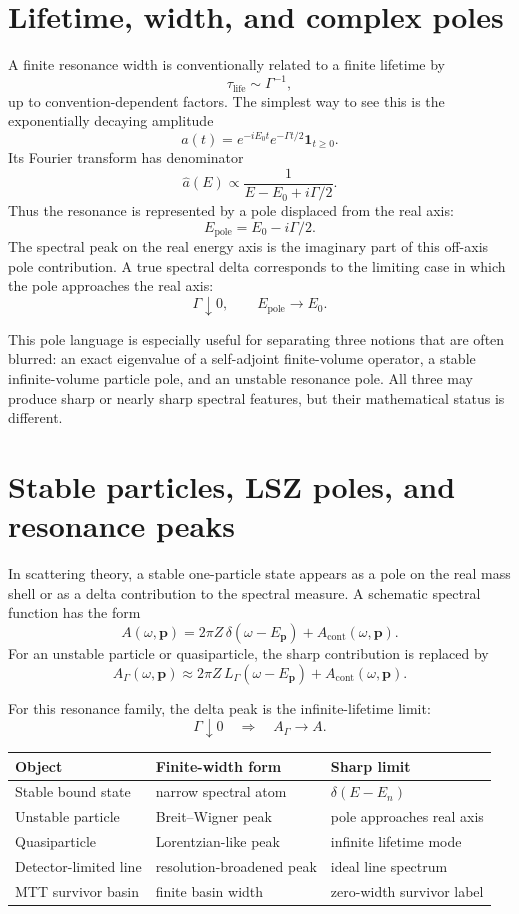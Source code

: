 \documentclass[11pt]{article}
\begin{document}
\section{Lifetime, width, and complex poles}

A finite resonance width is conventionally related to a finite lifetime by
\[
\tau_{\mathrm{life}}\sim \Gamma^{-1},
\]
up to convention-dependent factors. The simplest way to see this is the exponentially decaying amplitude
\[
a(t)=e^{-iE_0t}e^{-\Gamma t/2}\mathbf 1_{t\ge0}.
\]
Its Fourier transform has denominator
\[
\widehat a(E)\propto \frac{1}{E-E_0+i\Gamma/2}.
\]
Thus the resonance is represented by a pole displaced from the real axis:
\[
E_{\mathrm{pole}}=E_0-i\Gamma/2.
\]
The spectral peak on the real energy axis is the imaginary part of this off-axis pole contribution. A true spectral delta corresponds to the limiting case in which the pole approaches the real axis:
\[
\Gamma\downarrow0,
\qquad
E_{\mathrm{pole}}\to E_0.
\]

\begin{remark}
This pole language is especially useful for separating three notions that are often blurred: an exact eigenvalue of a self-adjoint finite-volume operator, a stable infinite-volume particle pole, and an unstable resonance pole. All three may produce sharp or nearly sharp spectral features, but their mathematical status is different.
\end{remark}

\section{Stable particles, LSZ poles, and resonance peaks}

In scattering theory, a stable one-particle state appears as a pole on the real mass shell or as a delta contribution to the spectral measure. A schematic spectral function has the form
\[
A(\omega,\mathbf p)
=
2\pi Z\,\delta(\omega-E_{\mathbf p})
+
A_{\mathrm{cont}}(\omega,\mathbf p).
\]
For an unstable particle or quasiparticle, the sharp contribution is replaced by
\[
A_\Gamma(\omega,\mathbf p)
\approx
2\pi Z\,L_\Gamma(\omega-E_{\mathbf p})
+
A_{\mathrm{cont}}(\omega,\mathbf p).
\]

For this resonance family, the delta peak is the infinite-lifetime limit:
\[
\Gamma\downarrow0
\quad\Longrightarrow\quad
A_\Gamma\to A.
\]

\begin{center}
\begin{tabular}{lll}
\hline
Object & Finite-width form & Sharp limit\\
\hline
Stable bound state & narrow spectral atom & $\delta(E-E_n)$\\
Unstable particle & Breit--Wigner peak & pole approaches real axis\\
Quasiparticle & Lorentzian-like peak & infinite lifetime mode\\
Detector-limited line & resolution-broadened peak & ideal line spectrum\\
MTT survivor basin & finite basin width & zero-width survivor label\\
\hline
\end{tabular}
\end{center}
\end{document}
